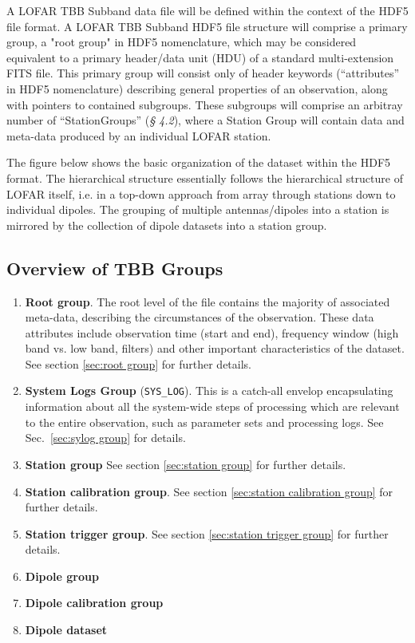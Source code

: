 \documentclass[a4paper,10pt,bibtotoc]{scrartcl}
\begin{document}
A LOFAR TBB Subband data file will be defined within the context
of the HDF5 file format.  A LOFAR TBB Subband HDF5 file structure
will comprise a primary group, a "root group" in HDF5 nomenclature,
which may be considered equivalent to a primary header/data unit (HDU)
of a standard multi-extension FITS file.  This primary group will
consist only of header  keywords (“attributes” in HDF5 nomenclature)
describing general properties of an observation, along with pointers
to contained subgroups.  These subgroups will comprise an arbitray
number of ``StationGroups'' (\textit{§ 4.2}), where a Station Group
will contain data and meta-data produced by an individual LOFAR
station. 

The figure below shows the basic organization of the dataset within
the HDF5 format. The hierarchical structure essentially follows the
hierarchical structure of LOFAR itself, i.e. in a top-down approach
from array through stations down to individual dipoles. The grouping
of multiple antennas/dipoles into a station is mirrored by the
collection of dipole datasets into a station group.

\subsection{Overview of TBB Groups}

\begin{enumerate}
\item \textbf{Root group}. The root level of the file contains the
  majority of associated meta-data, describing the circumstances of
  the observation. These data attributes include observation time
  (start and end), frequency window (high band vs. low band, filters)
  and other important characteristics of the dataset. See
  section \ref{sec:root group} for further details.
\item \textbf{System Logs Group} (\verb|SYS_LOG|). This is a catch-all
  envelop encapsulating information about all the system-wide steps of
  processing which are relevant to the entire observation, such as
  parameter sets and processing logs. See Sec.~\ref{sec:sylog group} for details.
\item \textbf{Station group} See section \ref{sec:station group} for
  further details.
\item \textbf{Station calibration group}. See
  section \ref{sec:station calibration group} for further details.
\item \textbf{Station trigger group}. See section \ref{sec:station
    trigger group} for further details.
\item \textbf{Dipole group}
\item \textbf{Dipole calibration group}
\item \textbf{Dipole dataset}
\end{enumerate}
\end{document}
